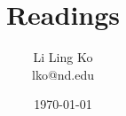 \documentclass{article}
\begin{document}
\title{Readings}
\author{Li Ling Ko\\ lko@nd.edu}
\date{\today}
\maketitle

%
%
%
%

\end{document}
